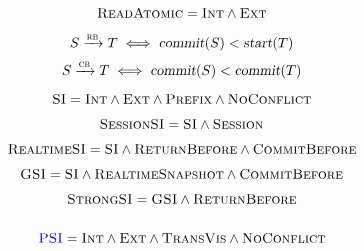 \begin{frame}{}
  \[
	\textsc{ReadAtomic} = \textsc{Int} \land \textsc{Ext}
  \]

  
  \vspace{0.30cm}

  \[
	S \xrightarrow{\textsc{rb}} T \iff \textsl{commit}(S) < \textsl{start}(T)
  \]
  \[
	S \xrightarrow{\textsc{cb}} T \iff \textsl{commit}(S) < \textsl{commit}(T)
  \]
\end{frame}

\begin{frame}{}
  \[
	\textsc{SI} = \textsc{Int} \land \textsc{Ext} \land \textsc{Prefix} \land \textsc{NoConflict}
  \]
\end{frame}

\begin{frame}{}
  \[
	\textsc{SessionSI} = \textsc{SI} \land \textsc{Session}
  \]

  \pause
  \[
	\textsc{RealtimeSI} = \textsc{SI} \land \textsc{ReturnBefore} \land \textsc{CommitBefore}
  \]

  \pause
  \[
	\textsc{GSI} = \textsc{SI} \land \textsc{RealtimeSnapshot} \land \textsc{CommitBefore}
  \]

  \pause
  \[
	\textsc{StrongSI} = \textsc{GSI} \land \textsc{ReturnBefore}
  \]
\end{frame}

\begin{frame}{}
  \uncover<2->{
	\[
		\transvisaxoim \triangleq (\vis^{+} = \vis)
	\]}

  \begin{columns}
	  \begin{itemize}
	  	\item \ansisi
	  	\item \si
	  	\item \gsi
	  	\item \strongsi
	  	\item \strongsessionsi
	  	\item \blue{\parallelsi}
	  	\item \gray{\wsi}
	  	\item \gray{\nmsi}
	  	\item \pcsi
	  \end{itemize}
  \end{columns}

  \pause
  \vspace{0.50cm}
  \[
	\textcolor{blue}{\textsc{PSI}} = \textsc{Int} \land \textsc{Ext} \land \textsc{TransVis} \land \textsc{NoConflict}
  \]
\end{frame}

